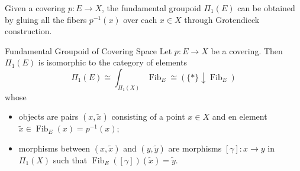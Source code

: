 \documentclass{report}
\begin{document}
Given a covering $p:E\to X$, the fundamental groupoid $\Pi_1(E)$ can be obtained by gluing all the fibers $p^{-1}(x)$ over each $x\in X$ through Grotendieck construction.

\begin{proposition}{Fundamental Groupoid of Covering Space}{}
	Let $p:E \to X$ be a covering. Then $\Pi_1(E)$ is isomorphic to the category of elements
	$$
		\Pi_1(E) \cong \int_{\Pi_1(X)} \operatorname{Fib}_E\cong  \left(\{*\} \downarrow \operatorname{Fib}_E\right)
	$$
	whose
	\begin{itemize}
		\item objects are pairs $(x, \widetilde{x})$ consisting of a point $x \in X$ and en element $\widetilde{x} \in \operatorname{Fib}_E(x)=p^{-1}(x)$;
		\item morphisms between $(x, \widetilde{x})$ and $\left(y, \widetilde{y}\right)$ are morphisms $[\gamma]: x \rightarrow y$ in $\Pi_1(X)$ such that $\operatorname{Fib}_E([\gamma])(\widetilde{x})=\widetilde{y}$.
	\end{itemize}
\end{proposition}
\end{document}
